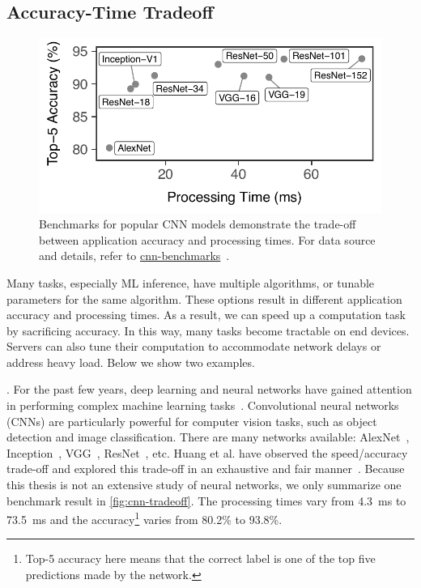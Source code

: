 \subsection{Accuracy-Time Tradeoff}
\label{sec:comp-perf-model}

\begin{figure}[t]
  \centering
  \includegraphics[width=.7\columnwidth]{figures/tradeoff-cnn.pdf}
  \caption{Benchmarks for popular CNN models demonstrate the trade-off between
    application accuracy and processing times. For data source and details,
    refer to
    \href{https://github.com/jcjohnson/cnn-benchmarks}{cnn-benchmarks}~\cite{cnn.benchmarks}.
  }
  \label{fig:cnn-tradeoff}
\end{figure}

Many tasks, especially ML inference, have multiple algorithms, or tunable
parameters for the same algorithm. These options result in different application
accuracy and processing times. As a result, we can speed up a computation task
by sacrificing accuracy. In this way, many tasks become tractable on end
devices. Servers can also tune their computation to accommodate network delays
or address heavy load. Below we show two examples.

. For the past few years, deep
learning and neural networks have gained attention in performing complex machine
learning tasks~\cite{goodfellow2016deep}. Convolutional neural networks (CNNs)
are particularly powerful for computer vision tasks, such as object detection
and image classification. There are many networks available:
AlexNet~\cite{krizhevsky2012imagenet}, Inception~\cite{szegedy2015going},
VGG~\cite{simonyan2014very}, ResNet~\cite{he2016deep}, etc. Huang et al. have
observed the speed/accuracy trade-off and explored this trade-off in an
exhaustive and fair manner~\cite{huang2016speed}. Because this thesis is not an
extensive study of neural networks, we only summarize one benchmark result in
\autoref{fig:cnn-tradeoff}. The processing times vary from \SI{4.3}{\ms} to
\SI{73.5}{\ms} and the accuracy\footnote{Top-5 accuracy here means that the
  correct label is one of the top five predictions made by the network.} varies
from 80.2\% to 93.8\%.


